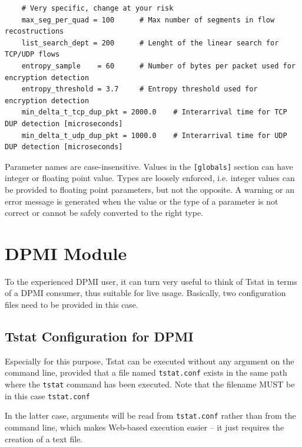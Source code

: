 \documentclass[11pt]{article}
\begin{document}
\begin{small}\begin{verbatim}
    # Very specific, change at your risk
    max_seg_per_quad = 100      # Max number of segments in flow recostructions
    list_search_dept = 200      # Lenght of the linear search for TCP/UDP flows
    entropy_sample    = 60      # Number of bytes per packet used for encryption detection
    entropy_threshold = 3.7     # Entropy threshold used for encryption detection
    min_delta_t_tcp_dup_pkt = 2000.0    # Interarrival time for TCP DUP detection [microseconds]
    min_delta_t_udp_dup_pkt = 1000.0    # Interarrival time for UDP DUP detection [microseconds]
\end{verbatim}\end{small} \noindent
Parameter names are case-insensitive. Values in the \texttt{[globals]} section can have integer or 
floating point value. Types are loosely enforced, i.e. integer values can be provided to floating point parameters,
but not the opposite. A warning or an error message is generated when the value or the type of
a parameter is not correct or cannot be safely converted to the right type.

\section{DPMI Module\label{DPMI_Module}}


To the experienced DPMI user, it can turn very useful to
think of Tstat in terms of a DPMI consumer, thus suitable
for live usage. Basically, two configuration files need to 
be provided in this case.

\subsection{Tstat Configuration for DPMI\label{Tstat_Configuration_for_DPMI}}


Especially for this purpose,  Tstat can be executed without any argument
on the command line, provided that a file named \texttt{tstat.conf} 
exists in the same path where the \texttt{tstat} command has been
executed. Note that the filename MUST be in this case \texttt{tstat.conf}



In the latter case, arguments will be read from 
\texttt{tstat.conf} rather than from the command line, which makes
Web-based execution easier -- it just requires the creation of
a text file.
\end{document}
